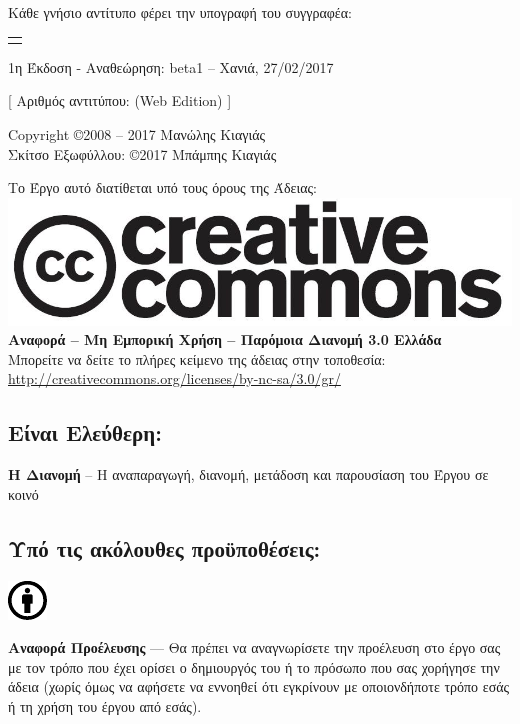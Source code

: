 %
%
\maketitle
\begin{center}
Κάθε γνήσιο αντίτυπο φέρει την υπογραφή του συγγραφέα:
\begin{tabular}{p{}}
\\
\\
\end{tabular}

\smallskip
1η Έκδοση - Αναθεώρηση: beta1 -- Χανιά, 27/02/2017

[ Αριθμός αντιτύπου: (Web Edition) ]

\smallskip
Copyright \copyright 2008 -- 2017 Μανώλης Κιαγιάς\\
Σκίτσο Εξωφύλλου: \copyright 2017 Μπάμπης Κιαγιάς

Το Έργο αυτό διατίθεται υπό τους όρους της Άδειας:\\
\includegraphics[scale=0.2]{images/license/cc-logo}\\
\textbf{Αναφορά -- Μη Εμπορική Χρήση --  Παρόμοια Διανομή 3.0 Ελλάδα}\\
Μπορείτε να δείτε το πλήρες κείμενο της άδειας στην τοποθεσία:\\
\url{http://creativecommons.org/licenses/by-nc-sa/3.0/gr/}
\end{center}
\subsection*{Είναι Ελεύθερη:}

\noindent
\textbf{Η Διανομή} -- Η αναπαραγωγή, διανομή, μετάδοση και παρουσίαση του Έργου σε κοινό
\subsection*{Υπό τις ακόλουθες προϋποθέσεις:}
\vspace{1em}
\noindent
\parbox{1.5cm}{\includegraphics[scale=0.15]{images/license/cc_by_30}}
\parbox{10.5cm}{\textbf{Αναφορά Προέλευσης} — Θα πρέπει να αναγνωρίσετε την προέλευση στο έργο σας με τον τρόπο που έχει ορίσει ο δημιουργός του ή το πρόσωπο που σας χορήγησε την άδεια (χωρίς όμως να αφήσετε να εννοηθεί  ότι εγκρίνουν  με οποιονδήποτε τρόπο εσάς ή τη χρήση του έργου από εσάς).}


